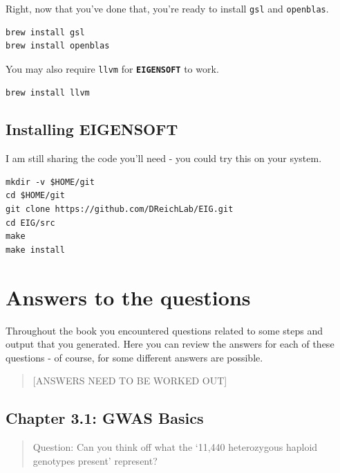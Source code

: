 \documentclass[
]{book}
\newcommand{\passthrough}[1]{#1}
\begin{document}
Right, now that you've done that, you're ready to install \passthrough{\lstinline!gsl!} and \passthrough{\lstinline!openblas!}.

\begin{lstlisting}
brew install gsl
brew install openblas
\end{lstlisting}

You may also require \passthrough{\lstinline!llvm!} for \textbf{\passthrough{\lstinline!EIGENSOFT!}} to work.

\begin{lstlisting}
brew install llvm
\end{lstlisting}

\hypertarget{installing-eigensoft}{%
\section{Installing EIGENSOFT}\label{installing-eigensoft}}

I am still sharing the code you'll need - you could try this on your system.

\begin{lstlisting}
mkdir -v $HOME/git
cd $HOME/git
git clone https://github.com/DReichLab/EIG.git
cd EIG/src
make
make install
\end{lstlisting}

\hypertarget{answers}{%
\chapter{Answers to the questions}\label{answers}}

Throughout the book you encountered questions related to some steps and output that you generated. Here you can review the answers for each of these questions - of course, for some different answers are possible.

\begin{quote}
{[}ANSWERS NEED TO BE WORKED OUT{]}
\end{quote}

\hypertarget{chapter-3.1-gwas-basics}{%
\section{Chapter 3.1: GWAS Basics}\label{chapter-3.1-gwas-basics}}

\begin{quote}
Question: Can you think off what the `11,440 heterozygous haploid genotypes present' represent?
\end{quote}
\end{document}

